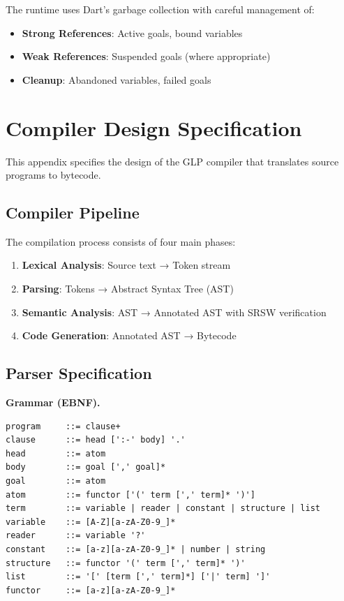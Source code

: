 \documentclass[runningheads,thm-restate]{llncs}
\newcommand{\mypara}[1]{\smallskip\noindent\textbf{#1.}}
\begin{document}
The runtime uses Dart's garbage collection with careful management of:
\begin{itemize}
\item \textbf{Strong References}: Active goals, bound variables
\item \textbf{Weak References}: Suspended goals (where appropriate)
\item \textbf{Cleanup}: Abandoned variables, failed goals
\end{itemize}

\section{Compiler Design Specification}\label{appendix:compiler-design}

This appendix specifies the design of the GLP compiler that translates source programs to bytecode.

\subsection{Compiler Pipeline}

The compilation process consists of four main phases:

\begin{enumerate}
\item \textbf{Lexical Analysis}: Source text → Token stream
\item \textbf{Parsing}: Tokens → Abstract Syntax Tree (AST)
\item \textbf{Semantic Analysis}: AST → Annotated AST with SRSW verification
\item \textbf{Code Generation}: Annotated AST → Bytecode
\end{enumerate}

\subsection{Parser Specification}

\mypara{Grammar (EBNF)}
\begin{verbatim}
program     ::= clause+
clause      ::= head [':-' body] '.'
head        ::= atom
body        ::= goal [',' goal]*
goal        ::= atom
atom        ::= functor ['(' term [',' term]* ')']
term        ::= variable | reader | constant | structure | list
variable    ::= [A-Z][a-zA-Z0-9_]*
reader      ::= variable '?'
constant    ::= [a-z][a-zA-Z0-9_]* | number | string
structure   ::= functor '(' term [',' term]* ')'
list        ::= '[' [term [',' term]*] ['|' term] ']'
functor     ::= [a-z][a-zA-Z0-9_]*
\end{verbatim}
\end{document}
